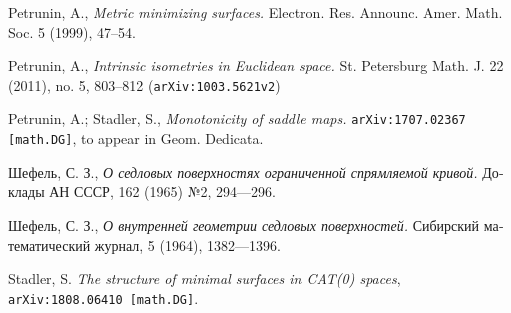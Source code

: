\documentclass{article}
\begin{document}
\begin{thebibliography}{52}
 Petrunin, A.,
\textit{Metric minimizing surfaces.}
Electron. Res. Announc. Amer. Math. Soc. 5 (1999), 47--54. 

 Petrunin, A.,
\textit{Intrinsic isometries in Euclidean space.}
St. Petersburg Math. J. 22 (2011), no. 5, 803--812 (\texttt{arXiv:1003.5621v2})

 Petrunin, A.; Stadler, S.,
\textit{Monotonicity of saddle maps.} 
\texttt{arXiv:1707.02367 [math.DG]}, to appear in Geom. Dedicata.





\begin{otherlanguage}{russian}
Шефель, С. З.,
\textit{О седловых поверхностях ограниченной спрямляемой кривой.}
Доклады АН СССР, 162 (1965) №2, 
294---296.
\end{otherlanguage}

\begin{otherlanguage}{russian}
Шефель, С. З., 
\textit{О внутренней геометрии седловых поверхностей.}
Сибирский математический журнал, 5 (1964), 1382---1396.
\end{otherlanguage}


 Stadler, S. \textit{The structure of minimal surfaces in CAT(0) spaces}, \texttt{arXiv:1808.06410 [math.DG]}.



   
  
\end{thebibliography}

\Addresses
\end{document}
